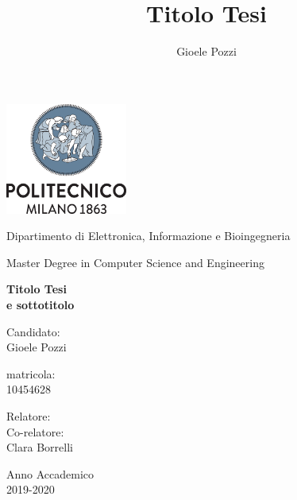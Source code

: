 \documentclass[oneside]{book}
\author{Gioele Pozzi}
\title{Titolo Tesi}
\begin{document}
\centering
\includegraphics[width=4cm]{../img/logo_polimi.png}

\vspace{1cm}
Dipartimento di Elettronica, Informazione e Bioingegneria

\vspace{0.25cm}
Master Degree in Computer Science and Engineering

\vspace{2cm}
\centering

\color{BrickRed}
\Huge
\textbf{
Titolo Tesi\\%
\Large e sottotitolo}

\normalsize
\vspace{2cm}
\color{black}
\flushright
Candidato:\\Gioele Pozzi

\vspace{0.5cm}
matricola:\\10454628

\vspace{0.5cm}
\flushleft
Relatore:\\

\vspace{0.5cm}
Co-relatore:\\ Clara Borrelli



\vfill
\centering
Anno Accademico \\ 2019-2020

\end{document}
